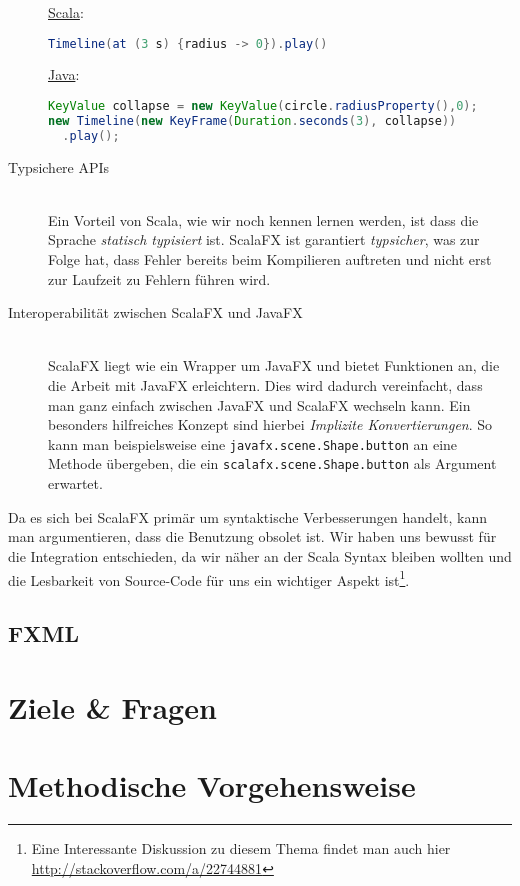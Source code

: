 \begin{description}
\underline{Scala}:
\begin{lstlisting}[language=scala,caption=Scala Beispiel für eine einface Animation,numbers=none]
Timeline(at (3 s) {radius -> 0}).play()
\end{lstlisting}

\underline{Java}:
\begin{lstlisting}[language=Java,caption=Das selbe Beispiel in Java,numbers=none]
KeyValue collapse = new KeyValue(circle.radiusProperty(),0);
new Timeline(new KeyFrame(Duration.seconds(3), collapse))
  .play();
\end{lstlisting}

\item[Typsichere APIs]\hfill\\
Ein Vorteil von Scala, wie wir noch kennen lernen werden, ist dass die Sprache \textit{statisch typisiert} ist. ScalaFX ist garantiert \textit{typsicher}, was zur Folge hat, dass Fehler bereits beim Kompilieren auftreten und nicht erst zur Laufzeit zu Fehlern führen wird. ~\cite{TypesAndProgrammingLanguages}

\item[Interoperabilität zwischen ScalaFX und JavaFX]\hfill\\
ScalaFX liegt wie ein Wrapper um JavaFX und bietet Funktionen an, die die Arbeit mit JavaFX erleichtern. Dies wird dadurch vereinfacht, dass man ganz einfach zwischen JavaFX und ScalaFX wechseln kann. Ein besonders hilfreiches Konzept sind hierbei \textit{Implizite Konvertierungen}. So kann man beispielsweise eine \texttt{javafx.scene.Shape.button} an eine Methode übergeben, die ein \texttt{scalafx.scene.Shape.button} als Argument erwartet.
\end{description}

Da es sich bei ScalaFX primär um syntaktische Verbesserungen handelt, kann man argumentieren, dass die Benutzung obsolet ist. Wir haben uns bewusst für die Integration entschieden, da wir näher an der Scala Syntax bleiben wollten und die Lesbarkeit von Source-Code für uns ein wichtiger Aspekt ist\footnote{Eine Interessante Diskussion zu diesem Thema findet man auch hier \url{http://stackoverflow.com/a/22744881}}.
\subsection{FXML}\label{sec:fxml}

\section{Ziele \& Fragen}
\section{Methodische Vorgehensweise}

